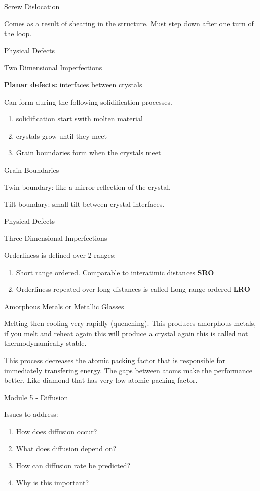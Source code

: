 \documentclass{article}
\begin{document}
\large
Screw Dislocation

\normalsize
Comes as a result of shearing in the structure. Must step down after one turn of the loop.

\LARGE
Physical Defects

Two Dimensional Imperfections

\normalsize
\textbf{Planar defects:} interfaces between crystals

Can form during the following solidification processes.
\begin{enumerate}
    \item solidification start swith molten material
    \item crystals grow until they meet
    \item Grain boundaries form when the crystals meet
\end{enumerate}

\Large
Grain Boundaries

\normalsize
Twin boundary: like a mirror reflection of the crystal.

Tilt boundary: small tilt between crystal interfaces.


\LARGE
Physical Defects

Three Dimensional Imperfections

\normalsize
Orderliness is defined over 2 ranges:
\begin{enumerate}
    \item Short range ordered. Comparable to interatimic distances \textbf{SRO}
    \item Orderliness repeated over long distances is called Long range ordered \textbf{LRO}
\end{enumerate}

Amorphous Metals or Metallic Glasses

Melting then cooling very rapidly (quenching). 
This produces amorphous metals, if you melt and reheat again this will produce a crystal again this is called not thermodynamically stable.

This process decreases the atomic packing factor that is responsible for immediately transfering energy.
The gaps between atoms make the performance better. Like diamond that has very low atomic packing factor.


\Huge
Module 5 - Diffusion

\normalsize
Issues to address:
\begin{enumerate}
    \item How does diffusion occur?
    \item What does diffusion depend on?
    \item How can diffusion rate be predicted?
    \item Why is this important?
\end{enumerate}
\end{document}

